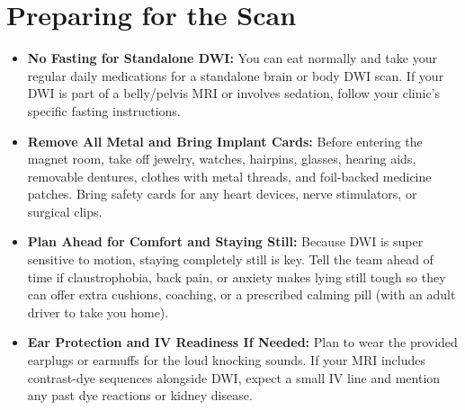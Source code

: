 \section{Preparing for the Scan}
\begin{itemize}
\item \textbf{No Fasting for Standalone DWI:} You can eat normally and take your regular daily medications for a standalone brain or body DWI scan. If your DWI is part of a belly/pelvis MRI or involves sedation, follow your clinic's specific fasting instructions.
\item \textbf{Remove All Metal and Bring Implant Cards:} Before entering the magnet room, take off jewelry, watches, hairpins, glasses, hearing aids, removable dentures, clothes with metal threads, and foil-backed medicine patches. Bring safety cards for any heart devices, nerve stimulators, or surgical clips.
\item \textbf{Plan Ahead for Comfort and Staying Still:} Because DWI is super sensitive to motion, staying completely still is key. Tell the team ahead of time if claustrophobia, back pain, or anxiety makes lying still tough so they can offer extra cushions, coaching, or a prescribed calming pill (with an adult driver to take you home).
\item \textbf{Ear Protection and IV Readiness If Needed:} Plan to wear the provided earplugs or earmuffs for the loud knocking sounds. If your MRI includes contrast-dye sequences alongside DWI, expect a small IV line and mention any past dye reactions or kidney disease.
\end{itemize}

